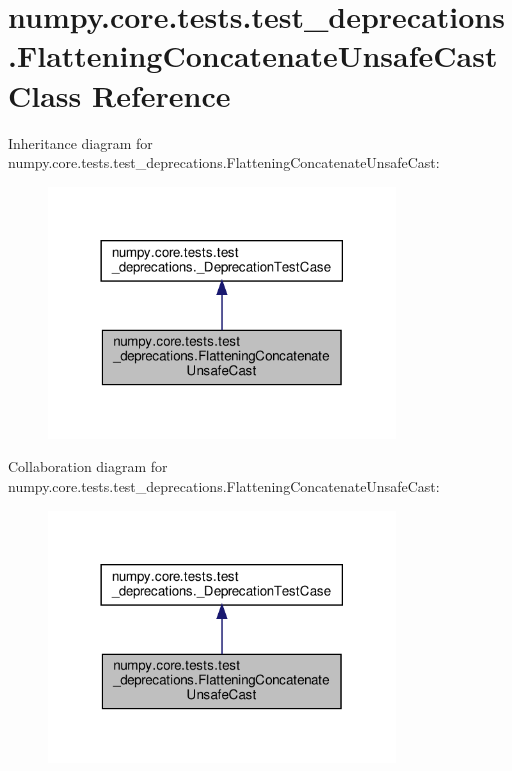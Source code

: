 \hypertarget{classnumpy_1_1core_1_1tests_1_1test__deprecations_1_1FlatteningConcatenateUnsafeCast}{}\section{numpy.\+core.\+tests.\+test\+\_\+deprecations.\+Flattening\+Concatenate\+Unsafe\+Cast Class Reference}
\label{classnumpy_1_1core_1_1tests_1_1test__deprecations_1_1FlatteningConcatenateUnsafeCast}


Inheritance diagram for numpy.\+core.\+tests.\+test\+\_\+deprecations.\+Flattening\+Concatenate\+Unsafe\+Cast\+:
\nopagebreak
\begin{figure}[H]
\begin{center}
\leavevmode
\includegraphics[width=261pt]{classnumpy_1_1core_1_1tests_1_1test__deprecations_1_1FlatteningConcatenateUnsafeCast__inherit__graph}
\end{center}
\end{figure}


Collaboration diagram for numpy.\+core.\+tests.\+test\+\_\+deprecations.\+Flattening\+Concatenate\+Unsafe\+Cast\+:
\nopagebreak
\begin{figure}[H]
\begin{center}
\leavevmode
\includegraphics[width=261pt]{classnumpy_1_1core_1_1tests_1_1test__deprecations_1_1FlatteningConcatenateUnsafeCast__coll__graph}
\end{center}
\end{figure}

